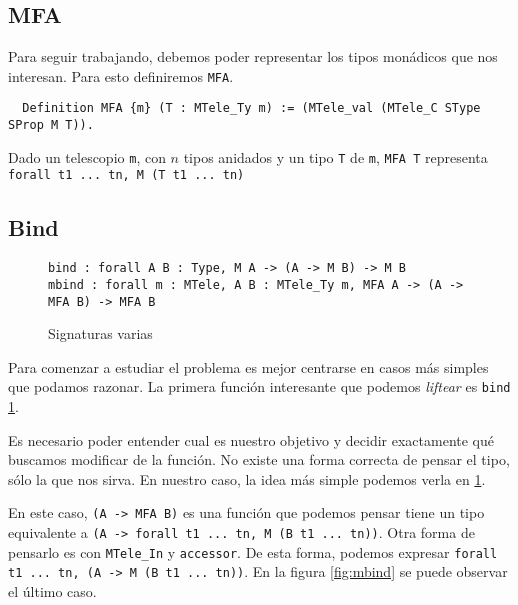 \subsection{MFA}

Para seguir trabajando, debemos poder representar los tipos monádicos que nos
interesan.
Para esto definiremos \lstinline{MFA}.

\begin{lstlisting}
  Definition MFA {m} (T : MTele_Ty m) := (MTele_val (MTele_C SType SProp M T)).
\end{lstlisting}

Dado un telescopio \lstinline{m}, con $n$ tipos anidados y un tipo \lstinline{T} de
\lstinline{m}, \lstinline{MFA T} representa \lstinline{forall t1 ... tn, M (T t1 ... tn)}


\subsection{Bind}



\begin{figure}[h]
  \centering
  \begin{lstlisting}
bind : forall A B : Type, M A -> (A -> M B) -> M B
mbind : forall m : MTele, A B : MTele_Ty m, MFA A -> (A -> MFA B) -> MFA B
  \end{lstlisting}
  \caption{Signaturas varias}
  \label{fig:bind}
\end{figure}

Para comenzar a estudiar el problema es mejor centrarse en casos más simples que
podamos razonar. La primera función interesante que podemos \textit{liftear} es
\lstinline{bind} \ref{fig:bind}. 

Es necesario poder entender cual es nuestro objetivo y decidir exactamente qué
buscamos modificar de la función. No existe una forma correcta de pensar el
tipo, sólo la que nos sirva. En nuestro caso, la idea más simple podemos verla
en \ref{fig:bind}.

En este caso, \lstinline{(A -> MFA B)} es una función que podemos pensar tiene un
tipo equivalente a \lstinline{(A -> forall t1 ... tn, M (B t1 ... tn))}. Otra forma
de pensarlo es con \lstinline{MTele_In} y \lstinline{accessor}. De esta forma, podemos
expresar \lstinline{forall t1 ... tn, (A -> M (B t1 ... tn))}. En la figura
\ref{fig:mbind} se puede observar el último caso. 

